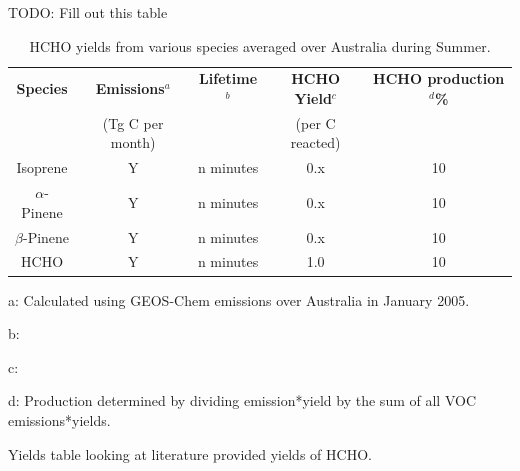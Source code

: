     TODO: Fill out this table
    \begin{table} \begin{threeparttable}
        \caption{HCHO yields from various species averaged over Australia during Summer.}
        \begin{tabular}{ | c  c  c  c  c | }
          \toprule
          \textbf{Species}   & \textbf{Emissions$^a$}& \textbf{Lifetime$^b$}& \textbf{HCHO Yield$^c$} & \textbf{HCHO production$^d$\%}
          \\                 & (Tg C per month)      &                      & (per C reacted)         &         \\
          \midrule
          Isoprene           & Y                     & n minutes            & 0.x                     & 10       \\
          $\alpha$-Pinene    & Y                     & n minutes            & 0.x                     & 10       \\
          $\beta$-Pinene     & Y                     & n minutes            & 0.x                     & 10       \\
          HCHO               & Y                     & n minutes            & 1.0                     & 10       \\
          \bottomrule
        \end{tabular}
        \begin{tablenotes} 
          \item a: Calculated using GEOS-Chem emissions over Australia in January 2005.
          \item b:  
          \item c: 
          \item d: Production determined by dividing emission*yield by the sum of all VOC emissions*yields. 
        \end{tablenotes}
        \label{BioIsop:Method:tab_VOCAusYields}
      \end{threeparttable} \end{table}
      
      
      Yields table looking at literature provided yields of HCHO.
      
